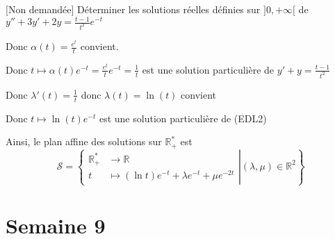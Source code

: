\documentclass{article}
\renewenvironment{question_kholle}[2][ ]
{
	\subsection{\texorpdfstring{#2}{}}
	\notblank{#1}
	{
		\noindent #1
		\bigbreak
	}
	{}
	\begin{proof}
}
{
	\end{proof}
}
\begin{document}
\begin{question_kholle}[]{[Non demandée] Déterminer les solutions réelles définies sur $]0, + \infty [$ de $y'' + 3y' +2y = \frac{t-1}{t^{2}}e^{ -t }$}
\begin{itemize}[label=$\star$]
\begin{itemize}[label=$\lozenge$]
\begin{itemize}[label=$\triangle$]
				                  Donc $\alpha(t) = \frac{e^{ t }}{t}$ convient.
			            \end{itemize}

			            Donc $t \mapsto \alpha(t)e^{ -t } = \frac{e^{ t }}{t}e^{ -t } = \frac{1}{t}$ est une solution particulière de $y'+y = \frac{t-1}{t^{2}}$
		      \end{itemize}
		      Donc $\lambda'(t) = \frac{1}{t}$ donc $\lambda(t) = \ln(t)$ convient

		      Donc $t \mapsto \ln (t) e^{ -t }$ est une solution particulière de (EDL2)
	\end{itemize}
	Ainsi, le plan affine des solutions sur $\mathbb{R}_{+}^{*}$ est
	$$
		\mathcal{S} = \left\{ \left.\begin{array}{ll} \mathbb{R}_{+}^{*} &\to \mathbb{R} \\ t &\mapsto (\ln t)e^{ -t }+ \lambda e^{ -t }+\mu e^{ -2t } \end{array}\right| (\lambda , \mu) \in \mathbb{R}^{2}\right\}
	$$

\end{question_kholle}


\pagebreak\section{Semaine 9}
\end{document}
